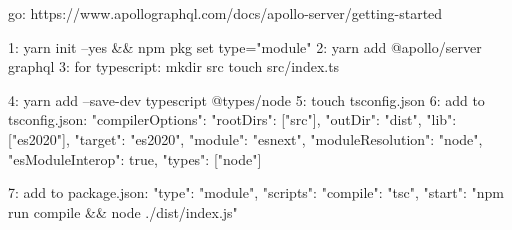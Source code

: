go: https://www.apollographql.com/docs/apollo-server/getting-started

1: yarn init --yes && npm pkg set type="module"
2: yarn add @apollo/server graphql
3: for typescript: 
    mkdir src
    touch src/index.ts

4: yarn add --save-dev typescript @types/node
5: touch tsconfig.json
6: add to tsconfig.json:
{
    "compilerOptions": {
      "rootDirs": ["src"],
      "outDir": "dist",
      "lib": ["es2020"],
      "target": "es2020",
      "module": "esnext",
      "moduleResolution": "node",
      "esModuleInterop": true,
      "types": ["node"]
    }
  }

  7: add to package.json:
  "type": "module",
  "scripts": {
    "compile": "tsc",
    "start": "npm run compile && node ./dist/index.js"
  }

